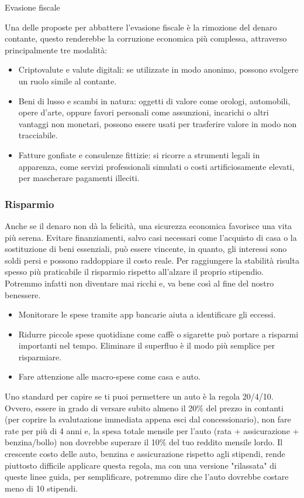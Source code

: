 \documentclass[12pt]{book} %
\begin{document}
\begin{mdframed}[linewidth=1pt]
Evasione fiscale

Una delle proposte per abbattere l'evasione fiscale è la rimozione del denaro contante, questo renderebbe la corruzione economica più complessa, attraverso principalmente tre modalità:

\begin{itemize}
\item Criptovalute e valute digitali: se utilizzate in modo anonimo, possono svolgere un ruolo simile al contante.
\item Beni di lusso e scambi in natura: oggetti di valore come orologi, automobili, opere d’arte, oppure favori personali come assunzioni, incarichi o altri vantaggi non monetari, possono essere usati per trasferire valore in modo non tracciabile.
\item Fatture gonfiate e consulenze fittizie: si ricorre a strumenti legali in apparenza, come servizi professionali simulati o costi artificiosamente elevati, per mascherare pagamenti illeciti.
\end{itemize}
\end{mdframed}

\subsubsection{Risparmio}

Anche se il denaro non dà la felicità, una sicurezza economica favorisce una vita più serena. Evitare finanziamenti, salvo casi necessari come l’acquisto di casa o la sostituzione di beni essenziali, può essere vincente, in quanto, gli interessi sono soldi persi e possono raddoppiare il costo reale.
Per raggiungere la stabilità risulta spesso più praticabile il risparmio rispetto all'alzare il proprio stipendio.
Potremmo infatti non diventare mai ricchi e, va bene così al fine del nostro benessere.
\begin{itemize}
\item Monitorare le spese tramite app bancarie aiuta a identificare gli eccessi. 
\item Ridurre piccole spese quotidiane come caffè o sigarette può portare a risparmi importanti nel tempo. Eliminare il superfluo è il modo più semplice per risparmiare.
\item Fare attenzione alle macro-spese come casa e auto.
\end{itemize}

Uno standard per capire se ti puoi permettere un auto è la regola 20/4/10. Ovvero, essere in grado di versare subito almeno il 20\% del prezzo in contanti (per coprire la svalutazione immediata appena esci dal concessionario), non fare rate per più di 4 anni e, la spesa totale mensile per l'auto (rata + assicurazione + benzina/bollo) non dovrebbe superare il 10\% del tuo reddito mensile lordo.
Il crescente costo delle auto, benzina e assicurazione rispetto agli stipendi, rende piuttosto difficile applicare questa regola, ma con una versione "rilassata" di queste linee guida, per semplificare, potremmo dire che l'auto dovrebbe costare meno di 10 stipendi.
\end{document}

